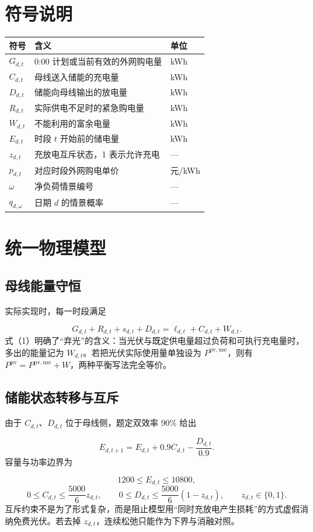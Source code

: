 \documentclass[12pt,a4paper]{ctexart}
\begin{document}
\section{符号说明}
\begin{table}[htbp]
\centering
\small
\begin{tabularx}{\textwidth}{@{}X X X@{}}
\toprule
符号 & 含义 & 单位 \\
\midrule
$G_{d,t}$ & 0:00 计划或当前有效的外网购电量 & kWh \\
$C_{d,t}$ & 母线送入储能的充电量 & kWh \\
$D_{d,t}$ & 储能向母线输出的放电量 & kWh \\
$R_{d,t}$ & 实际供电不足时的紧急购电量 & kWh \\
$W_{d,t}$ & 不能利用的富余电量 & kWh \\
$E_{d,t}$ & 时段 $t$ 开始前的储电量 & kWh \\
$z_{d,t}$ & 充放电互斥状态，1 表示允许充电 & — \\
$p_{d,t}$ & 对应时段外网购电单价 & 元/kWh \\
$\omega$ & 净负荷情景编号 & — \\
$q_{d,\omega}$ & 日期 $d$ 的情景概率 & — \\
\bottomrule
\end{tabularx}
\end{table}
\section{统一物理模型}
\subsection{母线能量守恒}
实际实现时，每一时段满足\par
\begin{equation}
G_{d,t}+R_{d,t}+s_{d,t}+D_{d,t}
=\ell_{d,t}+C_{d,t}+W_{d,t}.
\tag{1}
\end{equation}
式（1）明确了“弃光”的含义：当光伏与既定供电量超过负荷和可执行充电量时，多出的能量记为 $W_{d,t}$。若把光伏实际使用量单独设为 $P^{\mathrm{pv,use}}$，则有 $P^{\mathrm{pv}}=P^{\mathrm{pv,use}}+W$，两种平衡写法完全等价。\par
\subsection{储能状态转移与互斥}
由于 $C_{d,t}$、$D_{d,t}$ 位于母线侧，题定双效率 90\% 给出\par
\begin{equation}
E_{d,t+1}=E_{d,t}+0.9C_{d,t}-\frac{D_{d,t}}{0.9}.
\tag{2}
\end{equation}
容量与功率边界为\par
\begin{equation}
1200\le E_{d,t}\le10800,
\tag{3}
\end{equation}
\begin{equation}
0\le C_{d,t}\le \frac{5000}{6}z_{d,t},\qquad
0\le D_{d,t}\le \frac{5000}{6}(1-z_{d,t}),\qquad z_{d,t}\in\{0,1\}.
\tag{4}
\end{equation}
互斥约束不是为了形式复杂，而是阻止模型用“同时充放电产生损耗”的方式虚假消纳免费光伏。若去掉 $z_{d,t}$，连续松弛只能作为下界与消融对照。\par
\end{document}
